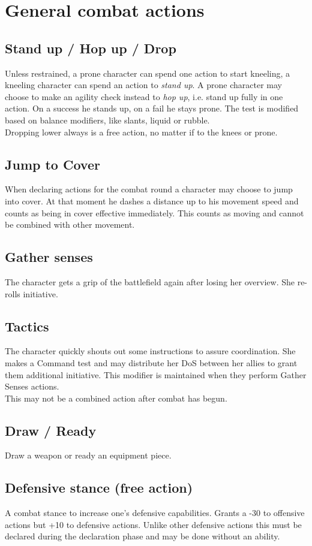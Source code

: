\pagebreak
\section{General combat actions}
\subsection*{Stand up / Hop up / Drop}
Unless restrained, a prone character can spend one action to start kneeling, a kneeling character can spend an action to \emph{stand up}. A prone character may choose to make an agility check instead to \emph{hop up}, i.e. stand up fully in one action. On a success he stands up, on a fail he stays prone. The test is modified based on balance modifiers, like slants, liquid or rubble.\\
Dropping lower always is a free action, no matter if to the knees or prone.
\subsection*{Jump to Cover}
When declaring actions for the combat round a character may choose to jump into cover.
At that moment he dashes a distance up to his movement speed
	and counts as being in cover effective immediately.
This counts as moving and cannot be combined with other movement.
\subsection*{Gather senses}
The character gets a grip of the battlefield again after losing her overview. She re-rolls initiative.
\subsection*{Tactics}
The character quickly shouts out some instructions to assure coordination. She makes a Command test and may distribute her DoS between her allies to grant them additional initiative. This modifier is maintained when they perform Gather Senses actions.\\
This may not be a combined action after combat has begun.
\subsection*{Draw / Ready}
Draw a weapon or ready an equipment piece.
\subsection*{Defensive stance (free action)}
A combat stance to increase one’s defensive capabilities. Grants a -30 to offensive actions but +10 to defensive actions. Unlike other defensive actions this must be declared during the declaration phase and may be done without an ability.
